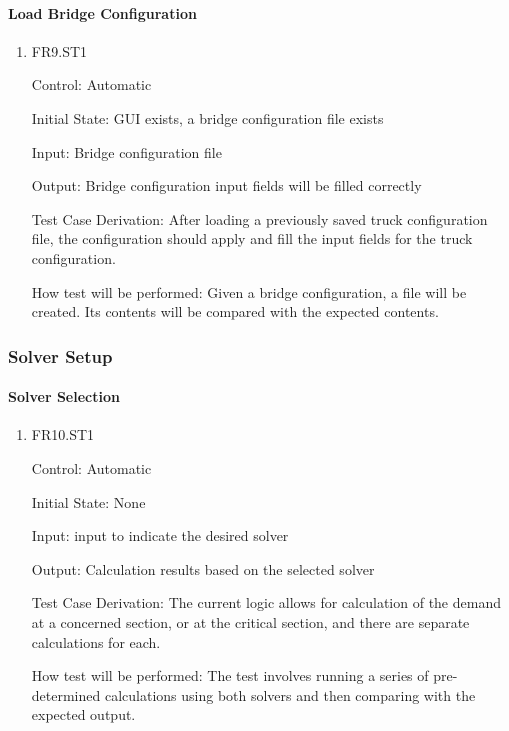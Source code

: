 \documentclass[12pt, titlepage]{article}
\begin{document}
\paragraph{Load Bridge Configuration}

\begin{enumerate}
  
  \item{FR9.ST1\\}
  
  Control: Automatic
  
  Initial State: GUI exists, a bridge configuration file exists
  
  Input: Bridge configuration file
  
  Output: Bridge configuration input fields will be filled correctly
  
  Test Case Derivation: After loading a previously saved truck configuration file, the configuration
  should apply and fill the input fields for the truck configuration.
  
  How test will be performed: Given a bridge configuration, a file will be created. Its contents
  will be compared with the expected contents.

\end{enumerate}

\subsubsection{Solver Setup}

\paragraph{Solver Selection}

\begin{enumerate}

  \item{FR10.ST1\\}

  Control: Automatic
            
  Initial State: None
            
  Input: input to indicate the desired solver 
            
  Output: Calculation results based on the selected solver

  Test Case Derivation: The current logic allows for calculation of the demand at a concerned section, or at the critical section, and there are separate calculations for each.

  How test will be performed: The test involves running a series of pre-determined calculations using both solvers and then comparing with the expected output. 
					
\end{enumerate}
\end{document}
